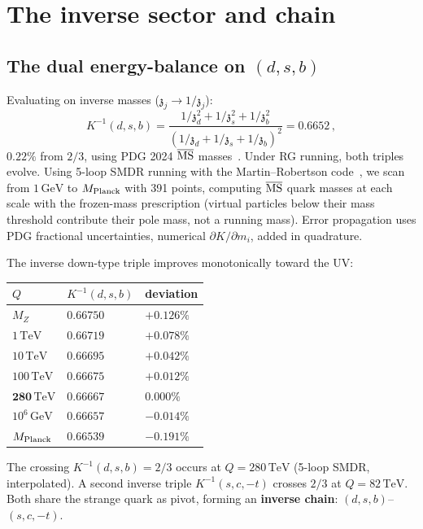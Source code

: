 \documentclass[aps,prd,twocolumn,showpacs,preprintnumbers,superscriptaddress,floatfix]{revtex4-2}
\newcommand{\GeV}{\,\mathrm{GeV}}
\newcommand{\TeV}{\,\mathrm{TeV}}
\newcommand{\zch}{\mathfrak{z}}
\begin{document}
\section{The inverse sector and chain}
\label{sec:inverse}

\subsection{The dual energy-balance on $(d, s, b)$}

Evaluating on inverse masses
($\zch_j \to 1/\zch_j$):
\begin{equation}
  K^{-1}(d,s,b) = \frac{1/\zch_d^2 + 1/\zch_s^2 + 1/\zch_b^2}
  {(1/\zch_d + 1/\zch_s + 1/\zch_b)^2}
  = 0.6652\,,
\end{equation}
$0.22\%$ from $2/3$, using PDG 2024 $\overline{\rm MS}$
masses~\cite{PDG:2024}.
Under RG running, both triples evolve.
Using 5-loop SMDR running with the Martin--Robertson
code~\cite{PDG:2024}, we scan from $1\GeV$ to $M_{\rm Planck}$
with 391 points, computing $\overline{\rm MS}$ quark masses at
each scale with the frozen-mass prescription (virtual particles
below their mass threshold contribute their pole mass, not a
running mass).
Error propagation uses PDG fractional uncertainties, numerical
$\partial K/\partial m_i$, added in quadrature.

The inverse down-type triple improves monotonically toward
the UV:
\begin{center}
\begin{tabular}{lll}
\hline
$Q$ & $K^{-1}(d,s,b)$ & deviation \\
\hline
$M_Z$ & $0.66750$ & $+0.126\%$ \\
$1\TeV$ & $0.66719$ & $+0.078\%$ \\
$10\TeV$ & $0.66695$ & $+0.042\%$ \\
$100\TeV$ & $0.66675$ & $+0.012\%$ \\
$\mathbf{280\TeV}$ & $\mathbf{0.66667}$ & $\mathbf{0.000\%}$ \\
$10^6\GeV$ & $0.66657$ & $-0.014\%$ \\
$M_{\rm Planck}$ & $0.66539$ & $-0.191\%$ \\
\hline
\end{tabular}
\end{center}
The crossing $K^{-1}(d,s,b) = 2/3$ occurs at
$Q = 280\TeV$ (5-loop SMDR, interpolated).
A second inverse triple $K^{-1}(s,c,-t)$ crosses $2/3$
at $Q = 82\TeV$.
Both share the strange quark as pivot, forming an
\textbf{inverse chain}: $(d,s,b)$--$(s,c,-t)$.
\end{document}
